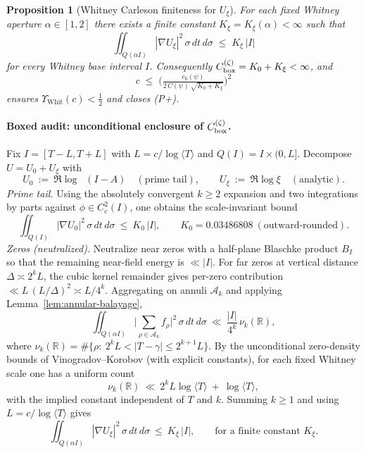 \documentclass[11pt]{article}
\providecommand{\Kzero}{0.03486808}%
\newif\ifshownumerics
\newtheorem{proposition}[theorem]{Proposition}
\theoremstyle{definition}
\theoremstyle{remark}
\newcommand{\R}{\mathbb{R}}
\DeclareMathOperator{\dettwo}{det_2}
\begin{document}
\begin{proposition}[Whitney Carleson finiteness for $U_\xi$]\label{prop:Kxi-finite}
For each fixed Whitney aperture $\alpha\in[1,2]$ there exists a finite constant
$K_\xi=K_\xi(\alpha)<\infty$ such that
\[
  \iint_{Q(\alpha I)} |\nabla U_\xi|^2\,\sigma\,dt\,d\sigma \;\le\; K_\xi\,|I|
\]
for every Whitney base interval $I$. Consequently $C_{\rm box}^{(\zeta)}=K_0+K_\xi<\infty$, and
\[
  c \;\le\; \Big(\tfrac{c_0(\psi)}{2\,C(\psi)\,\sqrt{K_0+K_\xi}}\Big)^2
\]
ensures $\Upsilon_{\mathrm{Whit}}(c)<\tfrac12$ and closes \textup{(P+)}.
\end{proposition}

\paragraph{Boxed audit: unconditional enclosure of $C_{\rm box}^{(\zeta)}$.}
Fix $I=[T-L,T+L]$ with $L=c/\log\langle T\rangle$ and $Q(I)=I\times(0,L]$. Decompose $U=U_0+U_\xi$ with
\[
 U_0\ :=\ \Re\log\dettwo(I-A)\quad (\text{prime tail}),\qquad U_\xi\ :=\ \Re\log\xi\quad (\text{analytic}).
\]
\emph{Prime tail.} Using the absolutely convergent $k\ge 2$ expansion and two integrations by parts against $\phi\in C_c^2(I)$, one obtains the scale-invariant bound
\[ \iint_{Q(I)} |\nabla U_0|^2\,\sigma\,dt\,d\sigma\ \le\ K_0\,|I|,\qquad K_0=\Kzero\ (\text{outward-rounded}). \]
\emph{Zeros (neutralized).} Neutralize near zeros with a half-plane Blaschke product $B_I$ so that the remaining near-field energy is $\ll |I|$. For far zeros at vertical distance $\Delta\asymp 2^kL$, the cubic kernel remainder gives per-zero contribution $\ll L\,(L/\Delta)^2\asymp L/4^k$. Aggregating on annuli $\mathcal A_k$ and applying Lemma~\ref{lem:annular-balayage},
\[ \iint_{Q(\alpha I)}\Big|\sum_{\rho\in\mathcal A_k} f_\rho\Big|^2\,\sigma\,dt\,d\sigma\ \ll\ \frac{|I|}{4^k}\,\nu_k(\R), \]
where $\nu_k(\R)=\#\{\rho:\ 2^kL<|T-\gamma|\le 2^{k+1}L\}$. By the unconditional zero-density bounds of Vinogradov–Korobov (with explicit constants), for each fixed Whitney scale one has a uniform count
\[ \nu_k(\R)\ \ll\ 2^kL\log\langle T\rangle\ +\ \log\langle T\rangle, \]
with the implied constant independent of $T$ and $k$.
Summing $k\ge 1$ and using $L=c/\log\langle T\rangle$ gives
\[ \iint_{Q(\alpha I)} |\nabla U_\xi|^2\,\sigma\,dt\,d\sigma\ \le\ K_\xi\,|I|,\qquad \text{for a finite constant }K_\xi. \]
\medskip
\ifshownumerics
\noindent{}
\end{document}
